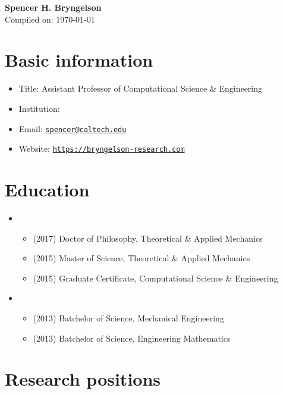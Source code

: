 



\begin{center}
    {\LARGE \bf Spencer H. Bryngelson} \\
    \medskip
    Compiled on: \today
\end{center}

\section{Basic information}
\begin{itemize}
    \item Title: Assistant Professor of Computational Science \& Engineering
    \item Institution: \GIT
    \item Email: \href{mailto:spencer@caltech.edu}{\texttt{spencer@caltech.edu}}
    \item Website: \href{https://bryngelson-research.com}{\texttt{https://bryngelson-research.com}}
\end{itemize}

\section{Education}

\begin{itemize}
    \item \UIUC
    \begin{itemize}
        \item (2017) Doctor of Philosophy, Theoretical \& Applied Mechanics
        \item (2015) Master of Science, Theoretical \& Applied Mechanics
        \item (2015) Graduate Certificate, Computational Science \& Engineering
    \end{itemize}
    \item \UMD
    \begin{itemize}
        \item (2013) Batchelor of Science, Mechanical Engineering
        \item (2013) Batchelor of Science, Engineering Mathematics
    \end{itemize}
\end{itemize}


\section{Research positions}

